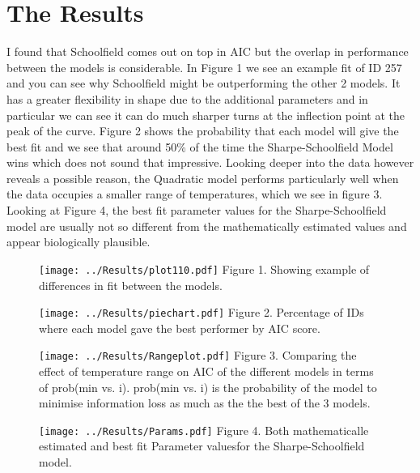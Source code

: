 \documentclass[12pt]{article}
\begin{document}
  \section{The Results}
  I found that Schoolfield comes out on top in AIC but the overlap in performance between the models is considerable. 
  In Figure 1 we see an example fit of ID 257 and you can see why Schoolfield 
  might be outperforming the other 2 models. It has a greater flexibility in shape due to the 
  additional parameters and in particular we can see it can do much sharper turns at the inflection point at 
  the peak of the curve. Figure 2 shows the probability that each model will give the best fit and we see that around 50\% of the time
  the Sharpe-Schoolfield Model wins which does not sound that impressive. Looking deeper into the data however reveals a possible reason, the 
  Quadratic model performs particularly well when the data 
  occupies a smaller range of temperatures, which we see in figure 3.\\
  Looking at Figure 4, the best fit parameter values for 
  the Sharpe-Schoolfield model are usually not so different from the 
  mathematically estimated values and appear biologically plausible.
  
  \begin{figure}[]
    \texttt{[image: ../Results/plot110.pdf]}
    Figure 1. Showing example of differences in fit between the models.
  \end{figure}

  \begin{figure}[]
    \texttt{[image: ../Results/piechart.pdf]}
    Figure 2. Percentage of IDs where each model gave the best performer by AIC score. 
  \end{figure}

  \begin{figure}[]
    \texttt{[image: ../Results/Rangeplot.pdf]}
    Figure 3. Comparing the effect of temperature range on AIC of the different models in terms of prob(min vs. i). 
    prob(min vs. i) is the probability of the model to minimise information loss as much as the the best of the 3 models.
  \end{figure}

  \begin{figure}[]
    \texttt{[image: ../Results/Params.pdf]}
    Figure 4. Both mathematicalle estimated and best fit Parameter valuesfor the Sharpe-Schoolfield model.
  \end{figure}
\end{document}
